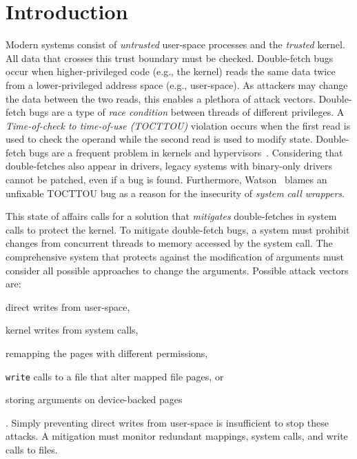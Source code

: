 \documentclass[conference]{IEEEtran}
\begin{document}
\section{Introduction}

Modern systems consist of \emph{untrusted} user-space processes and the
\emph{trusted} kernel.  All data that crosses this trust boundary must be
checked.  Double-fetch bugs~\cite{serna08doublefetch, twizsgrakky07ring0,
wilhelm2016xenpwn, wang2018survey} occur when higher-privileged code (e.g., the
kernel) reads the same data twice from a lower-privileged address space (e.g.,
user-space). As attackers may change the data between the two reads, this
enables a plethora of attack vectors.  Double-fetch bugs are a type of
\emph{race condition} between threads of different privileges. A
\emph{Time-of-check to time-of-use (TOCTTOU)} violation occurs when the first
read is used to check the operand while the second read is used to modify
state.  Double-fetch bugs are a frequent problem in kernels and
hypervisors~\cite{cve201812633, cve202012652, cve20131332, cve201920610,
cve20158550, cve201610439, cve201610435, cve201610433, cve20195519,
cve20168438}. Considering that double-fetches also appear in drivers, legacy
systems with binary-only drivers cannot be patched, even if a bug is found.
Furthermore, Watson~\cite{watson2007exploiting} blames an unfixable TOCTTOU bug
as a reason for the insecurity of \emph{system call wrappers}.  

This state of affairs calls for a solution that \emph{mitigates} double-fetches in
system calls to protect the kernel.
To mitigate double-fetch bugs, a system must prohibit changes from
concurrent threads to memory accessed by the system call.
The comprehensive system that protects against the modification of arguments
must consider all possible approaches to change the arguments.
Possible attack vectors are:
\begin{enumerate*}[label=\textbf{(\roman*)}]
\item  direct writes from user-space,
\item  kernel writes from system calls,
\item  remapping the pages with different permissions,
\item \texttt{write} calls to a file that alter mapped
file pages, or
\item  storing arguments on device-backed pages
\end{enumerate*}.
Simply preventing direct writes from user-space is insufficient to stop these attacks.
A mitigation must monitor redundant mappings, system calls, and write
calls to files.
\end{document}

